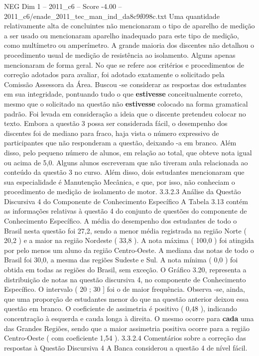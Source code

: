 \begin{textsample}{NEG Dim 1 – 2011\_c6 – Score -4.00 – 2011\_c6/enade\_2011\_tec\_man\_ind\_da8c9f098c.txt}
Uma quantidade relativamente alta de concluintes não mencionaram o tipo de aparelho de medição a ser usado ou mencionaram aparelho inadequado para este tipo de medição, como multímetro ou amperímetro.
A grande maioria dos discentes não detalhou o procedimento usual de medição de resistência ao isolamento.
Alguns apenas mencionaram de forma geral.
No que se refere aos critérios e procedimentos de correção adotados para avaliar, foi adotado exatamente o solicitado pela Comissão Assessora da Área.
Buscou -se considerar as respostas dos estudantes em sua integridade, pontuando tudo o que \textbf{estivesse} conceitualmente correto, mesmo que o solicitado na questão não \textbf{estivesse} colocado na forma gramatical padrão.
Foi levada em consideração a ideia que o discente pretendeu colocar no texto.
Embora a questão 3 possa ser considerada fácil, o desempenho dos discentes foi de mediano para fraco, haja vista o número expressivo de participantes que não responderam a questão, deixando -a em branco.
Além disso, pelo pequeno número de alunos, em relação ao total, que obteve nota igual ou acima de 5,0.
Alguns alunos escreveram que não tiveram aula relacionada ao conteúdo da questão 3 no curso.
Além disso, dois estudantes mencionaram que sua especialidade é Manutenção Mecânica, e que, por isso, não conheciam o procedimento de medição de isolamento de motor. 3.3.2.3 Análise da Questão Discursiva 4 do Componente de Conhecimento Específico A Tabela 3.13 contém as informações relativas à questão 4 do conjunto de questões do componente de Conhecimento Específico.
A média do desempenho dos estudantes de todo o Brasil nesta questão foi 27,2, sendo a menor média registrada na região Norte ( 20,2 ) e a maior na região Nordeste ( 33,8 ).
A nota máxima ( 100,0 ) foi atingida por pelo menos um aluno da região Centro-Oeste.
A mediana das notas de todo o Brasil foi 30,0, a mesma das regiões Sudeste e Sul.
A nota mínima ( 0,0 ) foi obtida em todas as regiões do Brasil, sem exceção.
O Gráfico 3.20, representa a distribuição de notas na questão discursiva 4, no componente de Conhecimento Específico.
O intervalo ( 20 ; 30 ] foi o de maior frequência.
Observa -se, ainda, que uma proporção de estudantes menor do que na questão anterior deixou essa questão em branco.
O coeficiente de assimetria é positivo ( 0,48 ), indicando concentração à esquerda e cauda longa à direita.
O mesmo ocorre para \textbf{cada} uma das Grandes Regiões, sendo que a maior assimetria positiva ocorre para a região Centro-Oeste ( com coeficiente 1,54 ). 3.3.2.4 Comentários sobre a correção das respostas à Questão Discursiva 4 A Banca considerou a questão 4 de nível fácil.

\end{textsample}

